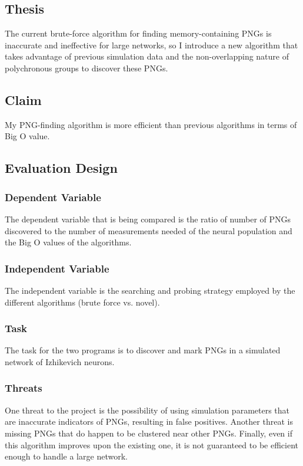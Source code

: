 \documentclass{sigchi}
\begin{document}
\subsection{Thesis}
The current brute-force algorithm for finding memory-containing PNGs is inaccurate and ineffective for large networks, so I introduce a new algorithm that takes advantage of previous simulation data and the non-overlapping nature of polychronous groups to discover these PNGs.

\subsection{Claim}
My PNG-finding algorithm is more efficient than previous algorithms in terms of Big O value.

\subsection{Evaluation Design}
\subsubsection{Dependent Variable}
The dependent variable that is being compared is the ratio of number of PNGs discovered to the number of measurements needed of the neural population and the Big O values of the algorithms. 

\subsubsection{Independent Variable}
The independent variable is the searching and probing strategy employed by the different algorithms (brute force vs. novel).

\subsubsection{Task}
The task for the two programs is to discover and mark PNGs in a simulated network of Izhikevich neurons.

\subsubsection{Threats}
One threat to the project is the possibility of using simulation parameters that are inaccurate indicators of PNGs, resulting in false positives. Another threat is missing PNGs that do happen to be clustered near other PNGs. Finally, even if this algorithm improves upon the existing one, it is not guaranteed to be efficient enough to handle a large network.
\end{document}
